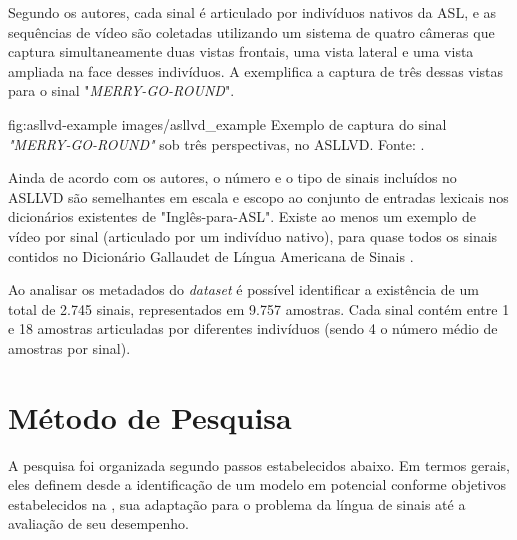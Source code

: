 Segundo os autores, cada sinal é articulado por indivíduos nativos da ASL, e as sequências de vídeo são coletadas utilizando um sistema de quatro câmeras que captura simultaneamente duas vistas frontais, uma vista lateral e uma vista ampliada na face desses indivíduos. A  exemplifica a captura de três dessas vistas para o sinal "\textit{MERRY-GO-ROUND}".

\image
    {fig:asllvd-example}
    {images/asllvd_example}
    {Exemplo de captura do sinal \textit{"MERRY-GO-ROUND"} sob três perspectivas, no ASLLVD. Fonte:  \cite[p. 2]{athitsos-asllvd-2008}.}

Ainda de acordo com os autores, o número e o tipo de sinais incluídos no ASLLVD são semelhantes em escala e escopo ao conjunto de entradas lexicais nos dicionários existentes de "Inglês-para-ASL". Existe ao menos um exemplo de vídeo por sinal (articulado por um indivíduo nativo), para quase todos os sinais contidos no Dicionário Gallaudet de Língua Americana de Sinais \cite{athitsos-asllvd-2008, gallaudet-2005}. 

Ao analisar os metadados do \textit{dataset} é possível identificar a existência de um total de 2.745 sinais, representados em 9.757 amostras. Cada sinal contém entre 1 e 18 amostras articuladas por diferentes indivíduos (sendo 4 o número médio de amostras por sinal).


\section{Método de Pesquisa} %

A pesquisa foi organizada segundo passos estabelecidos abaixo. Em termos gerais, eles definem desde a identificação de um modelo em potencial conforme objetivos estabelecidos na , sua adaptação para o problema da língua de sinais até a avaliação de seu desempenho.


